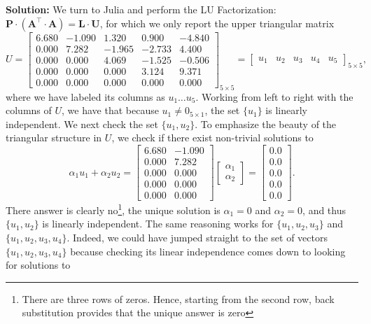 \textbf{Solution:} We turn to Julia and perform the LU Factorization: $\mathbf{P \cdot (A^\top \cdot A) = L \cdot U }$, for which we only report the upper triangular matrix
\begin{equation}
U=\left[
\begin{array}{rrrrr}
6.680 & -1.090 & 1.320 & 0.900 & -4.840 \\
0.000 & 7.282 & -1.965 & -2.733 & 4.400 \\
0.000 & 0.000 & 4.069 & -1.525 & -0.506 \\
0.000 & 0.000 & 0.000 & 3.124 & 9.371 \\
0.000 & 0.000 &  0.000 & 0.000 &  0.000 
\end{array}
\right]_{5 \times 5} = \left[
\begin{array}{rrrrr}
u_1 & u_2 & u_3 & u_4 & u_5
\end{array}
\right]_{5 \times 5},
\end{equation}
where we have labeled its columns as $u_1 \ldots u_5$. Working from left to right with the columns of $U$, we have that because $u_1 \neq 0_{5 \times 1}$, the set $\{ u_1\}$ is linearly independent. We next check the set $\{ u_1, u_2\}$. To emphasize the beauty of the triangular structure in $U$, we check if there exist non-trivial solutions to 
$$\alpha_1 u_1 + \alpha_2 u_2 = \left[ \begin{array}{rr}
6.680 & -1.090  \\
0.000 & 7.282 \\
0.000 & 0.000 \\
0.000 & 0.000  \\
0.000 & 0.000 
\end{array} \right] \left[
\begin{array}{r} \alpha_1 \\ \alpha_2 \end{array}
\right] = \left[ \begin{array}{r}
0.0 \\0.0\\0.0\\0.0\\0.0
\end{array} \right]. $$
There answer is clearly no\footnote{There are three rows of zeros. Hence, starting from the second row, back substitution provides that the unique answer is zero}, the unique solution is $\alpha_1=0$ and $\alpha_2=0$, and thus $\{ u_1, u_2\}$ is linearly independent. The same reasoning works for  $\{ u_1, u_2, u_3\}$ and  $\{ u_1, u_2, u_3, u_4\}$. Indeed, we could have jumped straight to the set of vectors $\{ u_1, u_2, u_3, u_4\}$ because checking its linear independence comes down to looking for solutions to 
